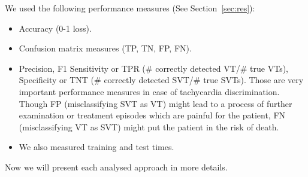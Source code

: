 We used the following performance measures (See 
Section~\ref{sec:res}):
\begin{itemize}
	\item Accuracy (0-1 loss).
	\item Confusion matrix measures (TP, TN, FP, FN).
	\item Precision,  F1
	Sensitivity or 
	TPR ($\#$ correctly detected VT/$\#$ true VTs), 
	Specificity or 
	TNT ($\#$ correctly detected SVT/$\#$ true SVTs). 
	Those are very important performance measures in case of 
	tachycardia discrimination. Though FP (misclassifying SVT as VT) 
	might lead 	to a 	process of further examination or treatment 
	episodes which are 
	painful for the patient, FN (misclassifying VT as SVT) might put 
	the patient in the risk of death.  
	\item We also measured training 
	and test times.
\end{itemize}
Now we will present each analysed approach in more details.

